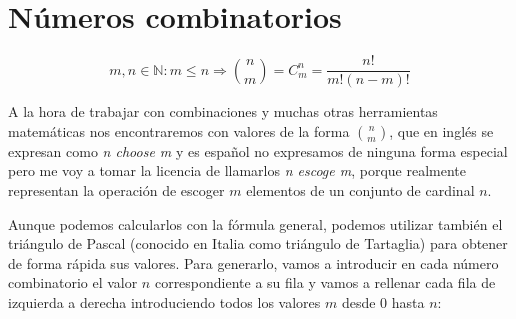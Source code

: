 \section{Números combinatorios}\label{numeros-combinatorios}

\[m,n \in\mathbb{N} : m \leq n \Rightarrow {n \choose m} = C_{m}^{n} = \frac{n!}{m!(n-m)!}\]

A la hora de trabajar con combinaciones y muchas otras herramientas matemáticas nos encontraremos con valores de la forma $n \choose m$, que en inglés se expresan como \textit{n choose m} y es español no expresamos de ninguna forma especial pero me voy a tomar la licencia de llamarlos \textit{n escoge m}, porque realmente representan la operación de escoger $m$ elementos de un conjunto de cardinal $n$.

Aunque podemos calcularlos con la fórmula general, podemos utilizar también el triángulo de Pascal (conocido en Italia como triángulo de Tartaglia) para obtener de forma rápida sus valores.
Para generarlo, vamos a introducir en cada número combinatorio el valor $n$ correspondiente a su fila y vamos a rellenar cada fila de izquierda a derecha introduciendo todos los valores $m$ desde 0 hasta $n$:

